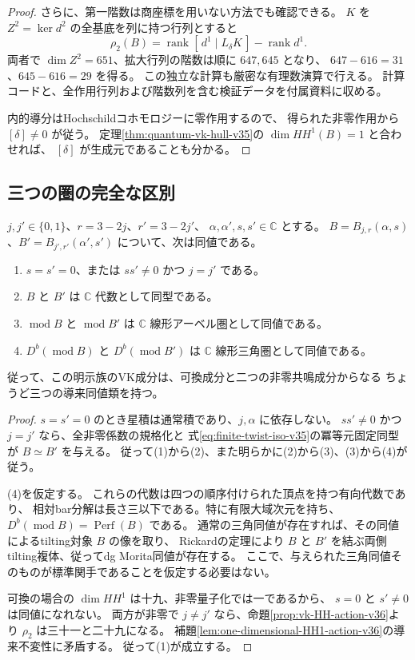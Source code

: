 \begin{proof}
さらに、第一階数は商座標を用いない方法でも確認できる。
$K$ を $Z^2=\ker d^2$ の全基底を列に持つ行列とすると
\[
 \rho_2(B)=\operatorname{rank}[\,d^1\mid L_\delta K\,]
                        -\operatorname{rank}d^1.
\]
両者で $\dim Z^2=651$、拡大行列の階数は順に $647,645$ となり、
$647-616=31$、$645-616=29$ を得る。
この独立な計算も厳密な有理数演算で行える。
計算コードと、全作用行列および階数列を含む検証データを付属資料に収める。

内的導分はHochschildコホモロジーに零作用するので、
得られた非零作用から $[\delta]\ne0$ が従う。
定理\ref{thm:quantum-vk-hull-v35}の $\dim HH^1(B)=1$ と合わせれば、
$[\delta]$ が生成元であることも分かる。
\end{proof}

\subsection{三つの圏の完全な区別}

\begin{theorem}[明示的な重み三CGG族内のVK分類]
\label{thm:vk-three-categories-v36}
$j,j'\in\{0,1\}$、$r=3-2j$、$r'=3-2j'$、
$\alpha,\alpha',s,s'\in\mathbb C$ とする。
$B=B_{j,r}(\alpha,s)$、$B'=B_{j',r'}(\alpha',s')$ について、次は同値である。
\begin{enumerate}
\item $s=s'=0$、または $ss'\ne0$ かつ $j=j'$ である。
\item $B$ と $B'$ は $\mathbb C$ 代数として同型である。
\item $\operatorname{mod}B$ と $\operatorname{mod}B'$ は
$\mathbb C$ 線形アーベル圏として同値である。
\item $D^b(\operatorname{mod}B)$ と $D^b(\operatorname{mod}B')$ は
$\mathbb C$ 線形三角圏として同値である。
\end{enumerate}
従って、この明示族のVK成分は、可換成分と二つの非零共鳴成分からなる
ちょうど三つの導来同値類を持つ。
\end{theorem}

\begin{proof}
$s=s'=0$ のとき星積は通常積であり、$j,\alpha$ に依存しない。
$ss'\ne0$ かつ $j=j'$ なら、全非零係数の規格化と
式\eqref{eq:finite-twist-iso-v35}の冪等元固定同型が $B\simeq B'$ を与える。
従って(1)から(2)、また明らかに(2)から(3)、(3)から(4)が従う。

(4)を仮定する。
これらの代数は四つの順序付けられた頂点を持つ有向代数であり、
相対bar分解は長さ三以下である。特に有限大域次元を持ち、
$D^b(\operatorname{mod}B)=\operatorname{Perf}(B)$ である。
通常の三角同値が存在すれば、その同値によるtilting対象 $B$ の像を取り、
Rickardの定理\cite{RickardMorita1989,RickardDerived1991}により
$B$ と $B'$ を結ぶ両側tilting複体、従ってdg Morita同値が存在する。
ここで、与えられた三角同値そのものが標準関手であることを仮定する必要はない。

可換の場合の $\dim HH^1$ は十九、非零量子化では一であるから、
$s=0$ と $s'\ne0$ は同値になれない。
両方が非零で $j\ne j'$ なら、命題\ref{prop:vk-HH-action-v36}より
$\rho_2$ は三十一と二十九になる。
補題\ref{lem:one-dimensional-HH1-action-v36}の導来不変性に矛盾する。
従って(1)が成立する。
\end{proof}

